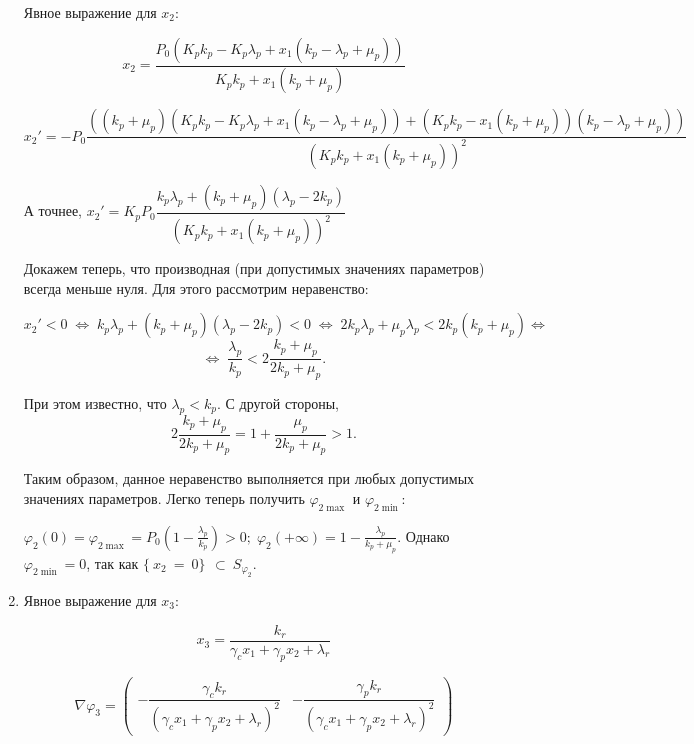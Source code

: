 \documentclass[12pt,a4paper]{article}
\begin{document}
\begin{enumerate}
    Явное выражение для $x_2$:
    
        
        $$ x_2 = \frac{P_{0} \left(K_{p} k_{p} - K_{p} \lambda_{p} + x_{1} \left(k_{p} - \lambda_{p} + \mu_{p}\right)\right)}{K_{p} k_{p} + x_{1} \left(k_{p} + \mu_{p}\right)}$$
    
        
        $$ x_2' = - P_{0}\dfrac{ \left(\left(k_{p} + \mu_{p}\right) \left(K_{p} k_{p} - K_{p} \lambda_{p} + x_{1} \left(k_{p} - \lambda_{p} + \mu_{p}\right)\right) + \left(K_{p} k_{p} - x_{1} \left(k_{p} + \mu_{p}\right)\right) \left(k_{p} - \lambda_{p} + \mu_{p}\right)\right)}{\left(K_{p} k_{p} + x_{1} \left(k_{p} + \mu_{p}\right)\right)^{2}} $$
    
        
        А точнее, $ x_2' = K_p P_0  \dfrac{k_p\lambda_p + (k_p + \mu_p)(\lambda_p - 2k_p)}{\left( K_p  k_p + x_1 \left(k_p + \mu_p\right)\right)^{2}}  $
    
    Докажем теперь, что производная (при допустимых значениях параметров) всегда меньше нуля. Для этого рассмотрим неравенство:

    $$ x_2' < 0\; \Leftrightarrow \;
    k_p\lambda_p + (k_p + \mu_p)(\lambda_p - 2k_p) < 0\; \Leftrightarrow\;
    2 k_p \lambda_p + \mu_p\lambda_p < 2 k_p(k_p + \mu_p)
    \Leftrightarrow $$
    $$ \Leftrightarrow\; 
    \dfrac{\lambda_p}{k_p} < 2 \dfrac{k_p + \mu_p}{2k_p + \mu_p}.
    $$
    
    При этом известно, что $\lambda_p < k_p$. С другой стороны,
    $$ 2 \dfrac{k_p + \mu_p}{2k_p + \mu_p} = 
    1 + \dfrac{\mu_p}{2k_p + \mu_p} > 1.     
    $$

    Таким образом, данное неравенство выполняется при любых допустимых значениях параметров. Легко теперь получить $\varphi_{2 \max}$ и $\varphi_{2 \min}$:
    
    $\varphi_2(0) = \varphi_{2 \max} = P_0 \left( 1 - \frac{\lambda_p}{k_p}\right) > 0;\;  \varphi_2(+\!\infty) = 1 - \frac{\lambda_p}{k_p + \mu_p}.$
    Однако $ \varphi_{2 \min} = 0 $, так как $\{~x_2~=~0\}\,~\subset~S_{\varphi_2}$.


    \item Явное выражение для $x_3$:

        
        $$ x_3 = \frac{k_{r}}{\gamma_{c} x_{1} + \gamma_{p} x_{2} + \lambda_{r}}$$

        
        $$
        \nabla \varphi_3 = \left(\begin{matrix}- \dfrac{\gamma_{c} k_{r}}{\left(\gamma_{c} x_{1} + \gamma_{p} x_{2} + \lambda_{r}\right)^{2}} 
        &
        - \dfrac{\gamma_{p} k_{r}}{\left(\gamma_{c} x_{1} + \gamma_{p} x_{2} + \lambda_{r}\right)^{2}}\end{matrix}\right) 
        $$


\end{enumerate}
\end{document}
